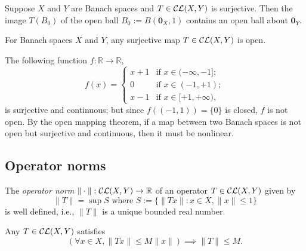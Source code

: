 \begin{lem}
  \label{lem:helpForOpenMapping}
  Suppose $X$ and $Y$ are Banach spaces
  and $T\in {\cal CL}(X,Y)$ is surjective.
  Then the image $T(B_0)$ of the open ball
  $B_0:=B(\mathbf{0}_X,1)$ contains an open ball about $\mathbf{0}_Y$.
\end{lem}

\begin{thm}
  \label{thm:openMapping}
  For Banach spaces $X$ and $Y$,
  any surjective map $T\in {\cal CL}(X,Y)$ is open.
\end{thm}

\begin{exm}
  The following function $f: \mathbb{R}\rightarrow \mathbb{R}$, 
  \begin{displaymath}
    f(x) =
    \begin{cases}
      x+1 & \text{if } x\in (-\infty, -1];
      \\
      0 & \text{if } x\in (-1, +1);
      \\
      x-1 & \text{if } x\in [+1,+\infty),
    \end{cases}
  \end{displaymath}
  is surjective and continuous;
  but since $f((-1,1))=\{0\}$ is closed,
  $f$ is not open.
  By the open mapping theorem,
  if a map between two Banach spaces
  is not open but surjective and continuous, 
  then it must be nonlinear.
\end{exm}

\subsection{Operator norms}
\label{sec:operator-norms}

\begin{lem}
  \label{def:OpNormCLXY}
  The \emph{operator norm}
  $\|\cdot\|: {\cal CL}(X,Y)\rightarrow \mathbb{R}$
  of an operator $T\in {\cal CL}(X,Y)$ given by 
  \begin{equation}
    \label{eq:OpNormCLXY}
    \|T\|= \sup S \text{ where }
    S:=\bigl\{\|Tx\|: x\in X, \|x\|\le 1\bigr\} 
  \end{equation}
  is well defined, i.e., $\|T\|$ is a unique bounded real number.
\end{lem}

\begin{lem}
  \label{lem:opNormIsLeastUpperBound}
  Any $T\in {\cal CL}(X,Y)$ satisfies 
  \begin{equation}
    \label{eq:opNormIsLeastUpperBound}
    \left(\forall x\in X, \|Tx\|\le M \|x\|\right)
     \implies \|T\|\le M.
  \end{equation}
\end{lem}

